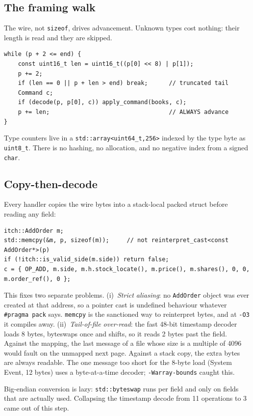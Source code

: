 \documentclass[10pt,a4paper]{article}
\newcommand{\code}[1]{\texttt{#1}}
\begin{document}
\subsection{The framing walk}
The wire, not \code{sizeof}, drives advancement. Unknown types cost nothing: their length is read and they are skipped.
\begin{lstlisting}
while (p + 2 <= end) {
    const uint16_t len = uint16_t((p[0] << 8) | p[1]);
    p += 2;
    if (len == 0 || p + len > end) break;      // truncated tail
    Command c;
    if (decode(p, p[0], c)) apply_command(books, c);
    p += len;                                  // ALWAYS advance
}
\end{lstlisting}
Type counters live in a \code{std::array<uint64\_t,256>} indexed by the type byte as \code{uint8\_t}.
There is no hashing, no allocation, and no negative index from a signed \code{char}.

\subsection{Copy-then-decode}
Every handler copies the wire bytes into a stack-local packed struct before reading any field:
\begin{lstlisting}
itch::AddOrder m;
std::memcpy(&m, p, sizeof(m));     // not reinterpret_cast<const AddOrder*>(p)
if (!itch::is_valid_side(m.side)) return false;
c = { OP_ADD, m.side, m.h.stock_locate(), m.price(), m.shares(), 0, 0, m.order_ref(), 0 };
\end{lstlisting}
This fixes two separate problems.
(i)~\emph{Strict aliasing}: no \code{AddOrder} object was ever created at that address, so a pointer cast is undefined
behaviour whatever \code{\#pragma pack} says. \code{memcpy} is the sanctioned way to reinterpret bytes, and at \code{-O3} it compiles away.
(ii)~\emph{Tail-of-file over-read}: the fast 48-bit timestamp decoder loads 8 bytes, byteswaps once and shifts,
so it reads 2 bytes past the field. Against the mapping, the last message of a file whose size is a multiple of 4096 would
fault on the unmapped next page. Against a stack copy, the extra bytes are always readable.
The one message too short for the 8-byte load (System Event, 12 bytes) uses a byte-at-a-time decoder; \code{-Warray-bounds} caught this.

Big-endian conversion is lazy: \code{std::byteswap} runs per field and only on fields that are actually used.
Collapsing the timestamp decode from 11 operations to 3 came out of this step.
\end{document}
